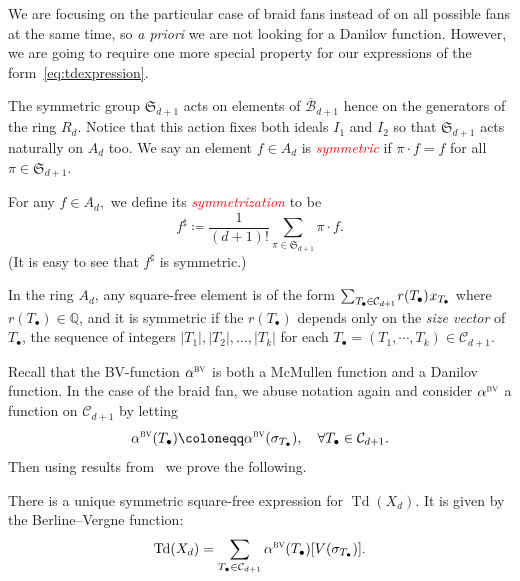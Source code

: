 \documentclass[ALCO,ThmDefs,Unicode,epreuves]{cedram}
\newcommand\fS{{\mathfrak S}}
\newcommand{\important}[1]{\emph{\textcolor{red}{#1}}}
\DeclareMathOperator{\td}{Td}
\newcommand{\hB}{\overline{\mathcal B}}
\newcommand{\CC}{\mathcal{C}}
\newcommand{\bv}{\alpha^{\textsc{bv}}}
\newcommand*{\mk}{\mkern -1mu}
\newcommand*{\Mk}{\mkern -2mu}
\begin{document}
We are focusing on the particular case of braid fans instead of on all possible fans at the same time, so \emph{a priori} we are not looking for a Danilov function. However, we are going to require one more special property for our expressions of the form~\eqref{eq:tdexpression}.

\begin{defi}\label{def:sym}
	The symmetric group $\fS_{d+1}$ acts on elements of $\hB_{d+1}$ hence on the generators of the ring $R_d$. Notice that this action fixes both ideals $I_1$ and $I_2$ so that $\fS_{d+1}$ acts naturally on $A_d$ too. We say an element $f\in A_d$ is \important{symmetric} if $\pi\cdot f=f$ for all $\pi\in \fS_{d+1}$. 
	
	For any $f \in A_d,$ we define its \important{symmetrization} to be 
	\begin{equation}\label{eq:sym}
	f^{\sharp}\coloneqq \dfrac{1}{(d+1)!}\sum_{\pi\in \fS_{d+1}} \pi\cdot f.
	\end{equation}
	(It is easy to see that $f^{\sharp}$ is symmetric.)
\end{defi}


\begin{rema}\label{rem:sym}
	In the ring $A_d$, any square-free element is of the form $\sum_{T_{\mk \bullet}\mk \in\mk \CC_{d\mk +\mk 1}} \Mk r(T_{\mk \bullet})\Mk \, x_{T_{\mk \bullet}}$ where $r(T_\bullet) \in \mathbb{Q}$, and it is symmetric if the $r(T_\bullet)$ depends only on the \emph{size vector} of $T_\bullet$, \ie the sequence of integers $|T_1|,|T_2|,\ldots,|T_k|$ for each $T_\bullet=(T_1,\cdots,T_k)\in\CC_{d+1}$.
	
\end{rema}

Recall that the BV-function $\bv$ is both a McMullen function and a Danilov function. In the case of the braid fan, we abuse notation again and consider $\bv$ a function on $\CC_{d+1}$ by letting
\[ \bv(T_\bullet) \coloneqq \bv(\sigma_{T_\bullet}), \quad \forall T_\bullet \in \CC_{d+1}.\]
Then using results from~\cite{bvalpha} we prove the following. 


\begin{thm}\label{thm:uniqueness} 
	There is a unique symmetric square-free expression for $\td(X_d).$ %
	It is given by the Berline--Vergne function: 
	\begin{equation}\label{eq:bvexp}
	\td(X_d) = \sum_{T_{\bullet}\in\CC_{d+1}} \bv(T_{\bullet}) [V(\sigma_{T_{\bullet}})].
	\end{equation}
\end{thm}
\end{document}
